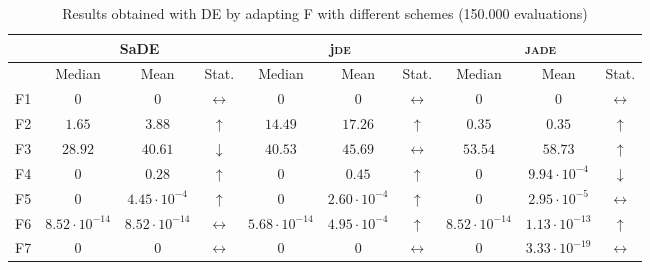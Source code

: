 \begin{table}[!t]
\caption{Results obtained with \textsc{DE} by adapting \textsc{F} with different schemes (150.000 evaluations)}
\label{tab:adaptive_de}
\centering
\begin{scriptsize}
\begin{tabular}{c || c c c | c c c | c c c }
\hline
 & \multicolumn{3}{|c|}{SaDE} & \multicolumn{3}{|c}{j\textsc{de}} & \multicolumn{3}{|c}{\textsc{jade}} \\ \hline
    & Median                & Mean                  & Stat.             & Median                & Mean                 & Stat.             & Median                & Mean                  & Stat.             \\ \hline
F1  & $0$                   & $0$                   & $\leftrightarrow$ & $0$                   & $0$                  & $\leftrightarrow$ & $0$                   & $0$                   & $\leftrightarrow$ \\ \hline
F2  & $1.65$                & $3.88$                & $\uparrow$        & $14.49$               & $17.26$              & $\uparrow$        & $0.35$                & $0.35$                & $\uparrow$        \\ \hline
F3  & $28.92$               & $40.61$               & $\downarrow$      & $40.53$               & $45.69$              & $\leftrightarrow$ & $53.54$               & $58.73$               & $\uparrow$        \\ \hline
F4  & $0$                   & $0.28$                & $\uparrow$        & $0$                   & $0.45$               & $\uparrow$        & $0$                   & $9.94 \cdot 10^{-4}$  & $\downarrow$      \\ \hline
F5  & $0$                   & $4.45 \cdot 10^{-4}$  & $\uparrow$        & $0$                   & $2.60 \cdot 10^{-4}$ & $\uparrow$        & $0$                   & $2.95 \cdot 10^{-5}$  & $\leftrightarrow$ \\ \hline
F6  & $8.52 \cdot 10^{-14}$ & $8.52 \cdot 10^{-14}$ & $\leftrightarrow$ & $5.68 \cdot 10^{-14}$ & $4.95 \cdot 10^{-4}$ & $\uparrow$        & $8.52 \cdot 10^{-14}$ & $1.13 \cdot 10^{-13}$ & $\uparrow$        \\ \hline
F7  & $0$                   & $0$                   & $\leftrightarrow$ & $0$                   & $0$                  & $\leftrightarrow$ & $0$                   & $3.33 \cdot 10^{-19}$ & $\leftrightarrow$ \\ \hline

\end{tabular}
\end{scriptsize}
\end{table}
